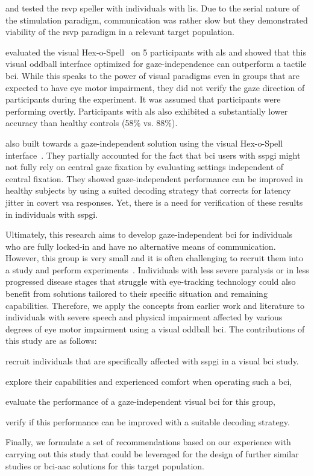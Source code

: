 \documentclass[twocolumn]{article}
\begin{document}
\textcite{Orhan2012} and \textcite{Oken2014} tested the \ac{rsvp} speller with
individuals with \ac{lis}. Due to the serial nature of the stimulation paradigm,
communication was rather slow but they demonstrated viability of the \ac{rsvp}
paradigm in a relevant target population.

\textcite{Severens2014} evaluated the visual Hex-o-Spell~\cite{Treder2010} on 5
participants with \ac{als} and showed that this visual oddball interface optimized
for gaze-independence can outperform a tactile \ac{bci}.
While this speaks to the power of visual paradigms even in groups that are
expected to have eye motor impairment, they did not verify the gaze direction
of participants during the experiment.
It was assumed that participants were performing overtly.
Participants with \ac{als} also exhibited a substantially lower accuracy than healthy
controls (58\% vs. 88\%).

\textcite{VanDenKerchove2024} also built towards a gaze-independent solution
using the visual Hex-o-Spell interface~\cite{VanDenKerchove2024}.
They partially accounted for the fact that \ac{bci} users with \ac{sspgi} might
not fully rely on central gaze fixation by evaluating settings independent of
central fixation.
They showed gaze-independent performance can be improved in healthy subjects by
using a suited decoding strategy that corrects for latency jitter in covert \ac{vsa} responses.
Yet, there is a need for verification of these results in individuals with
\ac{sspgi}.

Ultimately, this research aims to develop gaze-independent \ac{bci} for
individuals who are fully locked-in and have no alternative means of communication.
However, this group is very small and it is often challenging to recruit them
into a study and perform experiments~\cite{Wolpaw2006}.
Individuals with less severe paralysis or in less progressed disease stages that struggle with
eye-tracking technology could also benefit from
solutions tailored to their specific situation and remaining capabilities.
Therefore, we apply the concepts from earlier work and literature to
individuals with severe speech and physical impairment affected by various degrees of eye motor impairment
using a visual oddball \ac{bci}.
The contributions of this study are as follows:
\begin{enumerate*}[label={(\arabic*)}]
	\item recruit individuals that are specifically affected with \ac{sspgi} in
	      a visual \ac{bci} study.
	\item explore their capabilities and experienced comfort when operating such a \ac{bci},
	\item evaluate the performance of a gaze-independent visual \ac{bci} for this
	      group,
	\item verify if this performance can be improved with a suitable decoding
	      strategy.
\end{enumerate*}
Finally, we formulate a set of recommendations based on our experience with carrying out this study
that could be leveraged for the design of further similar studies or \ac{bci}-\ac{aac} solutions for this target population.
\end{document}
